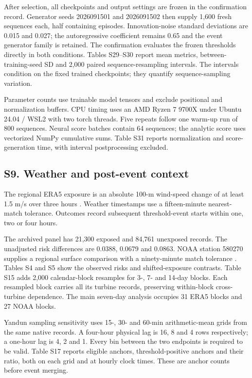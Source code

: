 \documentclass[a4paper,11pt]{article}
\begin{document}
After selection, all checkpoints and output settings are frozen in the confirmation record. Generator seeds 2026091501 and 2026091502 then supply 1,600 fresh sequences each, half containing episodes. Innovation-noise standard deviations are 0.015 and 0.027; the autoregressive coefficient remains 0.65 and the event generator family is retained. The confirmation evaluates the frozen thresholds directly in both conditions. Tables S29--S30 report mean metrics, between-training-seed SD and 2,000 paired sequence-resampling intervals. The intervals condition on the fixed trained checkpoints; they quantify sequence-sampling variation.

Parameter counts use trainable model tensors and exclude positional and normalization buffers. CPU timing uses an AMD Ryzen 7 9700X under Ubuntu 24.04 / WSL2 with two torch threads. Five repeats follow one warm-up run of 800 sequences. Neural score batches contain 64 sequences; the analytic score uses vectorized NumPy cumulative sums. Table S31 reports normalization and score-generation time, with interval postprocessing excluded.

\subsection{S9. Weather and post-event context}\label{s9.-weather-and-post-event-context}

The regional ERA5 exposure is an absolute 100-m wind-speed change of at least 1.5 m/s over three hours \citep{hersbach2020, era5docs}. Weather timestamps use a fifteen-minute nearest-match tolerance. Outcomes record subsequent threshold-event starts within one, two or four hours.

The archived panel has 21,300 exposed and 84,761 unexposed records. The unadjusted risk differences are 0.0388, 0.0679 and 0.0863. NOAA station 580270 supplies a regional surface comparison with a ninety-minute match tolerance \citep{noaaisd}. Tables S4 and S5 show the observed risks and shifted-exposure contrasts. Table S15 adds 2,000 calendar-block resamples for 3-, 7- and 14-day blocks. Each resampled block carries all its turbine records, preserving within-block cross-turbine dependence. The main seven-day analysis occupies 31 ERA5 blocks and 27 NOAA blocks.

Yandun sampling sensitivity uses 15-, 30- and 60-min arithmetic-mean grids from the same native records. A four-hour physical lag is 16, 8 and 4 rows respectively; a one-hour lag is 4, 2 and 1. Every bin between the two endpoints is required to be valid. Table S17 reports eligible anchors, threshold-positive anchors and their ratio, both on each grid and at hourly clock times. These are anchor counts before event merging.
\end{document}

